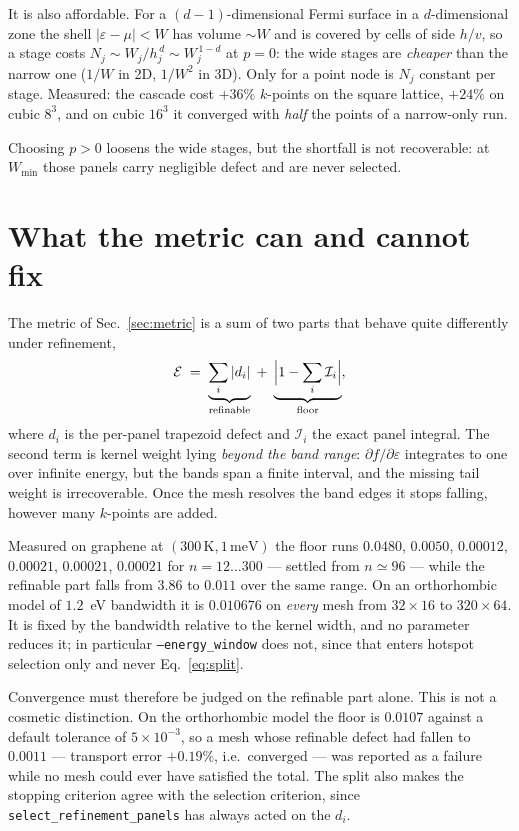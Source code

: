 \documentclass[11pt,a4paper]{article}
\newcommand{\code}[1]{\texttt{#1}}
\begin{document}
It is also affordable. For a $(d-1)$-dimensional Fermi surface in a
$d$-dimensional zone the shell $|\varepsilon-\mu|<W$ has volume $\sim W$ and
is covered by cells of side $h/v$, so a stage costs
$N_j \sim W_j/h_j^{\,d} \sim W_j^{\,1-d}$ at $p=0$: the wide stages are
\emph{cheaper} than the narrow one ($1/W$ in 2D, $1/W^2$ in 3D). Only for a
point node is $N_j$ constant per stage. Measured: the cascade cost $+36\%$
$k$-points on the square lattice, $+24\%$ on cubic $8^3$, and on cubic $16^3$
it converged with \emph{half} the points of a narrow-only run.

Choosing $p>0$ loosens the wide stages, but the shortfall is not recoverable:
at $W_\text{min}$ those panels carry negligible defect and are never selected.

\section{What the metric can and cannot fix}
\label{sec:floor}

The metric of Sec.~\ref{sec:metric} is a sum of two parts that behave quite
differently under refinement,
\begin{equation}
  \mathcal{E} \;=\; \underbrace{\sum_i |d_i|}_{\text{refinable}}
                \;+\; \underbrace{\Bigl|1 - \sum_i \mathcal{I}_i\Bigr|}_{\text{floor}} ,
  \label{eq:split}
\end{equation}
where $d_i$ is the per-panel trapezoid defect and $\mathcal{I}_i$ the exact
panel integral. The second term is kernel weight lying \emph{beyond the band
range}: $\partial f/\partial\varepsilon$ integrates to one over infinite
energy, but the bands span a finite interval, and the missing tail weight is
irrecoverable. Once the mesh resolves the band edges it stops falling, however
many $k$-points are added.

Measured on graphene at $(300\,\mathrm{K}, 1\,\mathrm{meV})$ the floor runs
$0.0480$, $0.0050$, $0.00012$, $0.00021$, $0.00021$, $0.00021$ for
$n = 12 \ldots 300$ --- settled from $n \simeq 96$ --- while the refinable part
falls from $3.86$ to $0.011$ over the same range. On an orthorhombic model of
$1.2$~eV bandwidth it is $0.010676$ on \emph{every} mesh from $32\times16$ to
$320\times64$. It is fixed by the bandwidth relative to the kernel width, and
no parameter reduces it; in particular \code{--energy\_window} does not, since
that enters hotspot selection only and never Eq.~\eqref{eq:split}.

Convergence must therefore be judged on the refinable part alone. This is not
a cosmetic distinction. On the orthorhombic model the floor is $0.0107$ against
a default tolerance of $5\times10^{-3}$, so a mesh whose refinable defect had
fallen to $0.0011$ --- transport error $+0.19\%$, i.e.\ converged --- was
reported as a failure while no mesh could ever have satisfied the total. The
split also makes the stopping criterion agree with the selection criterion,
since \code{select\_refinement\_panels} has always acted on the $d_i$.
\end{document}

